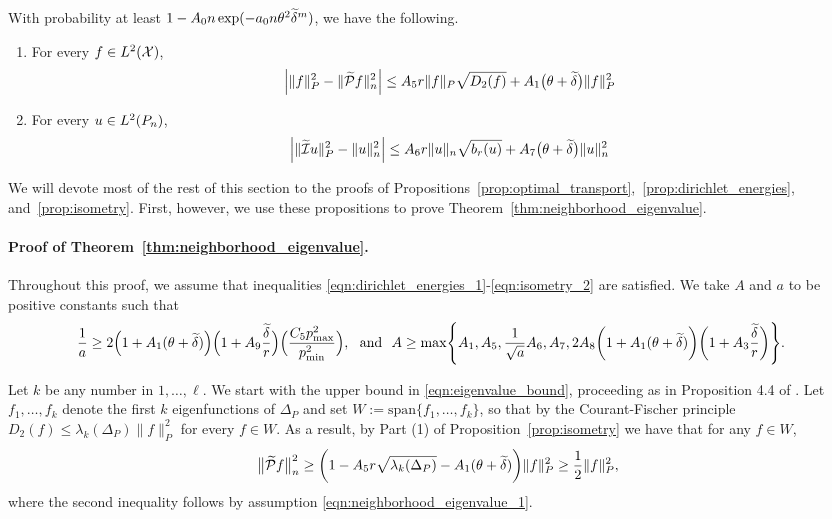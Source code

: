 \begin{proposition}
	\label{prop:isometry}
	With probability at least $1 - A_0n\exp(-a_0n\theta^2\widetilde{\delta}^{m})$, we have the following.
	\begin{enumerate}[(1)]
		\item For every $f \in L^2(\mathcal{X})$,
		\begin{equation}
		\label{eqn:isometry_1}
		\Bigl|\|f\|_{P}^2 - \|\widetilde{\mathcal{P}}f\|_{n}^2\Bigr| \leq A_5 r \|f\|_{P} \sqrt{D_2(f)} + A_1\bigl(\theta + \widetilde{\delta}\bigr)\|f\|_{P}^2
		\end{equation}
		\item For every $u \in L^2(P_n)$,
		\begin{equation}
		\label{eqn:isometry_2}
		\Bigl|\|\widetilde{\mathcal{I}}u\|_{P}^2 - \|u\|_{n}^2\Bigr| \leq A_6 r \|u\|_{n} \sqrt{b_r(u)} + A_7\bigl(\theta + \widetilde{\delta}\bigr) \|u\|_{n}^2
		\end{equation}
	\end{enumerate}
\end{proposition}

We will devote most of the rest of this section to the proofs of Propositions~\ref{prop:optimal_transport},~\ref{prop:dirichlet_energies}, and~\ref{prop:isometry}. First, however, we use these propositions to prove Theorem~\ref{thm:neighborhood_eigenvalue}.

\paragraph{Proof of Theorem~\ref{thm:neighborhood_eigenvalue}.}
Throughout this proof, we assume that inequalities \eqref{eqn:dirichlet_energies_1}-\eqref{eqn:isometry_2} are satisfied. We take $A$ and $a$ to be positive constants such that
\begin{align*}
\frac{1}{a} & \geq 2\Bigl(1 + A_1(\theta + \widetilde{\delta})\Bigr)\Bigl(1 + A_9\frac{\widetilde{\delta}}{r}\Bigr)\Bigl(\frac{C_5 p_{\max}^2}{p_{\min}^2}\Bigr) ,~~\textrm{and}~~A \geq \max\Biggl\{A_1,A_5, \frac{1}{\sqrt{a}}A_6, A_7, 2A_8\biggl(1 + A_1(\theta + \widetilde{\delta})\biggr) \biggl(1 + A_3\frac{\widetilde{\delta}}{r}\biggr) \Biggr\}.
\end{align*}

Let $k$ be any number in $1,\ldots,\ell$. We start with the upper bound in \eqref{eqn:eigenvalue_bound}, proceeding as in Proposition 4.4 of \citet{burago2014}. Let $f_1,\ldots,f_{k}$ denote the first $k$ eigenfunctions of $\Delta_P$ and set $W := \mathrm{span}\{f_1,\ldots,f_k\}$, so that by the Courant-Fischer principle $D_2(f) \leq \lambda_k(\Delta_P) \|f\|_{P}^2$ for every $f \in W$. As a result, by Part (1) of Proposition~\ref{prop:isometry} we have that for any $f \in W$,
\begin{equation*}
\bigl\|\widetilde{\mathcal{P}}f\bigr\|_{n}^2 \geq \biggl(1 - A_5r \sqrt{\lambda_{k}(\Delta_P)} - A_1(\theta + \widetilde{\delta})\biggr)\|f\|_{P}^2  \geq \frac{1}{2} \|f\|_{P}^2,
\end{equation*}
where the second inequality follows by assumption \eqref{eqn:neighborhood_eigenvalue_1}. 

